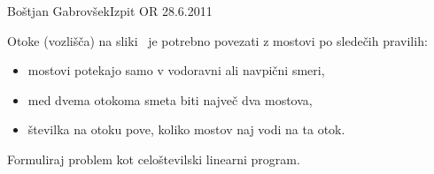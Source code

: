 \begin{naloga}{Boštjan Gabrovšek}{Izpit OR 28.6.2011}
\begin{vprasanje}
Otoke (vozlišča) na sliki~\fig{}
je potrebno povezati z mostovi po sledečih pravilih:
\begin{itemize}
\item mostovi potekajo samo v vodoravni ali navpični smeri,
\item med dvema otokoma smeta biti največ dva mostova,
\item številka na otoku pove, koliko mostov naj vodi na ta otok.
\end{itemize}
Formuliraj problem kot celoštevilski linearni program.

\begin{slika}
\pgfslika
{}
\end{slika}
\end{vprasanje}
\begin{odgovor}
\end{odgovor}
\end{naloga}
